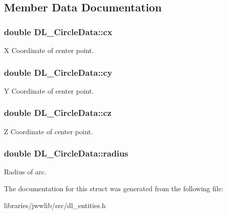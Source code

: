 \subsection{Member Data Documentation}
\hypertarget{structDL__CircleData_a8abd50f4cb3276037f6673fb31bf9513}{
\subsubsection[{cx}]{\setlength{\rightskip}{0pt plus 5cm}double D\-L\-\_\-\-Circle\-Data\-::cx}}\label{structDL__CircleData_a8abd50f4cb3276037f6673fb31bf9513}
X Coordinate of center point. \hypertarget{structDL__CircleData_a9a7eaa2a80357e5c16a41c76b8dd5796}{
\subsubsection[{cy}]{\setlength{\rightskip}{0pt plus 5cm}double D\-L\-\_\-\-Circle\-Data\-::cy}}\label{structDL__CircleData_a9a7eaa2a80357e5c16a41c76b8dd5796}
Y Coordinate of center point. \hypertarget{structDL__CircleData_af0db7a3bedd1a4c0fcc173561f8d81f2}{
\subsubsection[{cz}]{\setlength{\rightskip}{0pt plus 5cm}double D\-L\-\_\-\-Circle\-Data\-::cz}}\label{structDL__CircleData_af0db7a3bedd1a4c0fcc173561f8d81f2}
Z Coordinate of center point. \hypertarget{structDL__CircleData_a0504d7c0f6012bb956b7aa0791a16dff}{
\subsubsection[{radius}]{\setlength{\rightskip}{0pt plus 5cm}double D\-L\-\_\-\-Circle\-Data\-::radius}}\label{structDL__CircleData_a0504d7c0f6012bb956b7aa0791a16dff}
Radius of arc. 

The documentation for this struct was generated from the following file\-:\begin{DoxyCompactItemize}
\item 
libraries/jwwlib/src/dl\-\_\-entities.\-h\end{DoxyCompactItemize}
